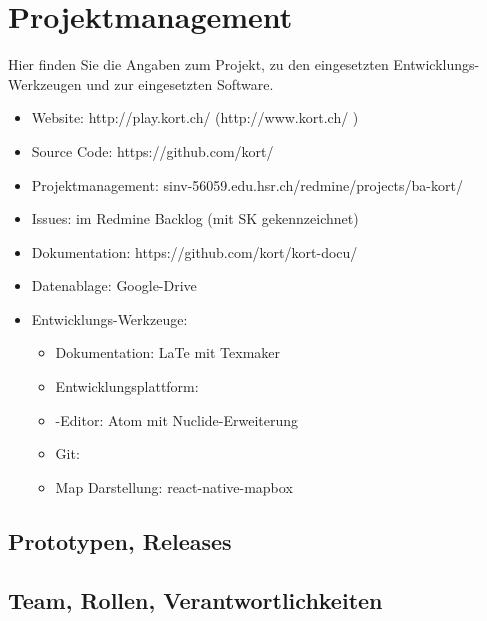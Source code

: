 \chapter{Projektmanagement}
\label{pm-projektmanagement}
Hier finden Sie die Angaben zum Projekt, zu den eingesetzten Entwicklungs-Werkzeugen und zur eingesetzten Software.

\begin{itemize}
    \item Website: http://play.kort.ch/ (http://www.kort.ch/ )
    \item Source Code: https://github.com/kort/
    \item Projektmanagement: sinv-56059.edu.hsr.ch/redmine/projects/ba-kort/
    \item Issues: im Redmine Backlog (mit SK gekennzeichnet)
    \item Dokumentation: https://github.com/kort/kort-docu/
    \item Datenablage: Google-Drive
    \item Entwicklungs-Werkzeuge:
    \begin{itemize}
    	\item Dokumentation: LaTe mit Texmaker
    	\item Entwicklungsplattform: 
    	\item {}-Editor: Atom mit Nuclide-Erweiterung
    	\item Git: 
    	\item Map Darstellung: react-native-mapbox
    \end{itemize}
\end{itemize}


\section{Prototypen, Releases}


\section{Team, Rollen, Verantwortlichkeiten}





